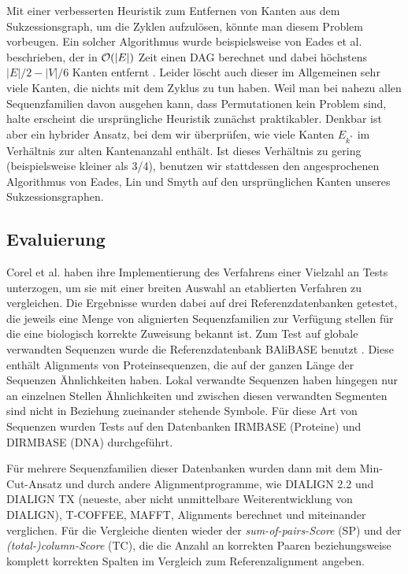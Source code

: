 Mit einer verbesserten Heuristik zum Entfernen von Kanten aus dem Sukzessionsgraph, um die Zyklen aufzulösen, könnte man diesem Problem vorbeugen. Ein solcher Algorithmus wurde beispielsweise von Eades et al. beschrieben, der in $\mathcal{O}(|E|)$ Zeit einen DAG berechnet und dabei höchstens $|E|/2 - |V|/6$ Kanten entfernt \cite{els93}. Leider löscht auch dieser im Allgemeinen sehr viele Kanten, die nichts mit dem Zyklus zu tun haben. Weil man bei nahezu allen Sequenzfamilien davon ausgehen kann, dass Permutationen kein Problem sind, halte erscheint die ursprüngliche Heuristik zunächst praktikabler. Denkbar ist aber ein hybrider Ansatz, bei dem wir überprüfen, wie viele Kanten $E_{k^{*}}$ im Verhältnis zur alten Kantenanzahl enthält. Ist dieses Verhältnis zu gering (beispielsweise kleiner als 3/4), benutzen wir stattdessen den angesprochenen Algorithmus von Eades, Lin und Smyth auf den ursprünglichen Kanten unseres Sukzessionsgraphen.

\subsection{Evaluierung}

Corel et al. haben ihre Implementierung des Verfahrens einer Vielzahl an Tests unterzogen, um sie mit einer breiten Auswahl an etablierten Verfahren zu vergleichen\cite{cpm10}. Die Ergebnisse wurden dabei auf drei Referenzdatenbanken getestet, die jeweils eine Menge von alignierten Sequenzfamilien zur Verfügung stellen für die eine biologisch korrekte Zuweisung bekannt ist. Zum Test auf globale verwandten Sequenzen wurde die Referenzdatenbank BAliBASE benutzt \cite{tpp99}. Diese enthält Alignments von Proteinsequenzen, die auf der ganzen Länge der Sequenzen Ähnlichkeiten haben. Lokal verwandte Sequenzen haben hingegen nur an einzelnen Stellen Ähnlichkeiten und zwischen diesen verwandten Segmenten sind nicht in Beziehung zueinander stehende Symbole. Für diese Art von Sequenzen wurden Tests auf den Datenbanken IRMBASE (Proteine) und DIRMBASE (DNA) durchgeführt.

Für mehrere Sequenzfamilien dieser Datenbanken wurden dann mit dem Min-Cut-Ansatz und durch andere Alignmentprogramme, wie DIALIGN 2.2 und DIALIGN TX (neueste, aber nicht unmittelbare Weiterentwicklung von DIALIGN), T-COFFEE, MAFFT, Alignments berechnet und miteinander verglichen. Für die Vergleiche dienten wieder der \emph{sum-of-pairs-Score} (SP) und der \emph{(total-)column-Score} (TC), die die Anzahl an korrekten Paaren beziehungsweise komplett korrekten Spalten im Vergleich zum Referenzalignment angeben.

